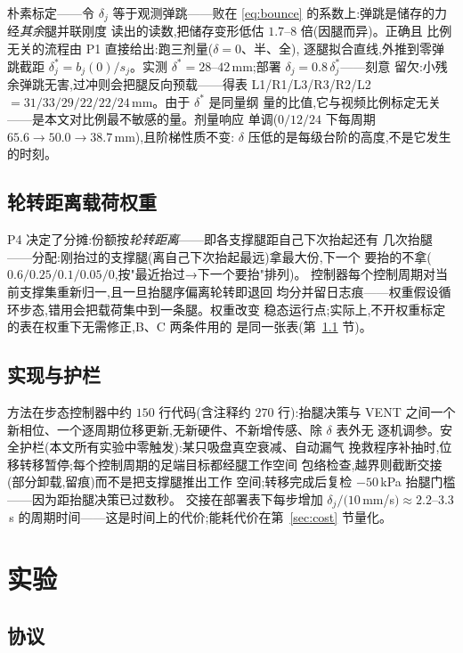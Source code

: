 \documentclass[journal]{IEEEtran}
\newcommand{\dstar}{\delta^{*}}
\begin{document}
朴素标定——令 $\delta_j$ 等于观测弹跳——败在
\eqref{eq:bounce} 的系数上:弹跳是储存的力经\emph{其余}腿并联刚度
读出的读数,把储存变形低估 $1.7$--$8$ 倍(因腿而异)。正确且
比例无关的流程由 P1 直接给出:跑三剂量($\delta = 0$、半、全),
逐腿拟合直线,外推到零弹跳截距 $\dstar_j = b_j(0)/s_j$。实测
$\dstar = 28$--$42$\,mm;部署 $\delta_j = 0.8\,\dstar_j$——刻意
留欠:小残余弹跳无害,过冲则会把腿反向预载——得表
L1/R1/L3/R3/R2/L2 $= 31/33/29/22/22/24$\,mm。由于 $\dstar$ 是同量纲
量的比值,它与视频比例标定无关——是本文对比例最不敏感的量。剂量响应
单调($0/12/24$ 下每周期 $65.6\to50.0\to38.7$\,mm),且阶梯性质不变:
$\delta$ 压低的是每级台阶的高度,不是它发生的时刻。

\subsection{轮转距离载荷权重}

P4 决定了分摊:份额按\emph{轮转距离}——即各支撑腿距自己下次抬起还有
几次抬腿——分配:刚抬过的支撑腿(离自己下次抬起最远)拿最大份,下一个
要抬的不拿($0.6/0.25/0.1/0.05/0$,按"最近抬过→下一个要抬"排列)。
控制器每个控制周期对当前支撑集重新归一,且一旦抬腿序偏离轮转即退回
均分并留日志痕——权重假设循环步态,错用会把载荷集中到一条腿。权重改变
稳态运行点;实际上,不开权重标定的表在权重下无需修正,B、C 两条件用的
是同一张表(第~\ref{sec:protocol} 节)。

\subsection{实现与护栏}

方法在步态控制器中约 $150$ 行代码(含注释约 $270$ 行):抬腿决策与
VENT 之间一个新相位、一个逐周期位移更新,无新硬件、不新增传感、除 $\delta$ 表外无
逐机调参。安全护栏(本文所有实验中零触发):某只吸盘真空衰减、自动漏气
挽救程序补抽时,位移转移暂停;每个控制周期的足端目标都经腿工作空间
包络检查,越界则截断交接(部分卸载,留痕)而不是把支撑腿推出工作
空间;转移完成后复检 $-50$\,kPa 抬腿门槛——因为距抬腿决策已过数秒。
交接在部署表下每步增加 $\delta_j/(10$\,mm/s$)\approx2.2$--$3.3$\,s
的周期时间——这是时间上的代价;能耗代价在第~\ref{sec:cost} 节量化。

\section{实验}
\label{sec:experiments}

\subsection{协议}
\label{sec:protocol}
\end{document}
